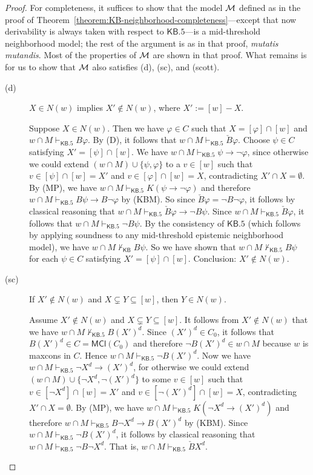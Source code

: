 \documentclass[12pt]{article}
\theoremstyle{definition}
\newcommand{\M}{{\cal M}}      %
\newcommand{\KB}{{\mathsf{KB}}}                 %
\newcommand{\KBeq}{{\mathsf{KB.5}}}             %
\newcommand{\MCl}{\mathsf{MCl}}                   %
\begin{document}
\begin{proof}
  For completeness, it suffices to show that the model $\M$ defined as
  in the proof of
  Theorem~\ref{theorem:KB-neighborhood-completeness}---except that now
  derivability is always taken with respect to $\KBeq$---is a
  mid-threshold neighborhood model; the rest of the argument is as in
  that proof, \emph{mutatis mutandis}.  Most of the properties of $\M$
  are shown in that proof.  What remains is for us to show that $\M$
  also satisfies (d), (sc), and (scott).
  \begin{description}
  \item[(d)] $X\in N(w)$ implies $X'\notin N(w)$, where
    $X':=[w]-X$.

    Suppose $X\in N(w)$.  Then we have $\varphi\in C$ such that
    $X=[\varphi]\cap[w]$ and $w\cap M\vdash_\KBeq B\varphi$.  By (D),
    it follows that $w\cap M\vdash_\KBeq\check B\varphi$.  Choose
    $\psi\in C$ satisfying $X'=[\psi]\cap[w]$.  We have
    $w\cap M\vdash_\KBeq\psi\to\lnot\varphi$, since otherwise we could
    extend $(w\cap M)\cup\{\psi,\varphi\}$ to a $v\in[w]$ such that
    $v\in[\psi]\cap[w]=X'$ and $v\in[\varphi]\cap[w]=X$, contradicting
    $X'\cap X=\emptyset$.  By (MP), we have
    $w\cap M\vdash_\KBeq K(\psi\to\lnot\varphi)$ and therefore
    $w\cap M\vdash_\KBeq B\psi\to B\lnot\varphi$ by (KBM).  So since
    $\check B\varphi=\lnot B\lnot\varphi$, it follows by classical
    reasoning that
    $w\cap M\vdash_\KBeq \check B\varphi\to\lnot B\psi$.  Since
    $w\cap M\vdash_\KBeq\check B\varphi$, it follows that
    $w\cap M\vdash_\KBeq\lnot B\psi$.  By the consistency of $\KBeq$
    (which follows by applying soundness to any mid-threshold
    epistemic neighborhood model), we have $w\cap M\nvdash_\KB B\psi$.
    So we have shown that $w\cap M\nvdash_\KBeq B\psi$ for each
    $\psi\in C$ satisfying $X'=[\psi]\cap[w]$.  Conclusion:
    $X'\notin N(w)$.

  \item[(sc)] If $X'\notin N(w)$ and $X\subsetneq Y\subseteq[w]$,
    then $Y\in N(w)$.

    Assume $X'\notin N(w)$ and $X\subsetneq Y\subseteq[w]$.  It
    follows from $X'\notin N(w)$ that we have
    $w\cap M\nvdash_\KBeq B(X')^d$.  Since $(X')^d\in C_0$, it follows
    that $B(X')^d\in C=\MCl(C_0)$ and therefore
    $\lnot B(X')^d\in w\cap M$ because $w$ is maxcons in $C$.  Hence
    $w\cap M\vdash_\KBeq \lnot B(X')^d$.  Now we have
    $w\cap M\vdash_\KBeq \lnot X^d\to (X')^d$, for otherwise we could
    extend $(w\cap M)\cup\{\lnot X^d,\lnot(X')^d\}$ to some $v\in[w]$
    such that $v\in[\lnot X^d]\cap[w]=X'$ and
    $v\in[\lnot(X')^d]\cap[w]=X$, contradicting $X'\cap X=\emptyset$.
    By (MP), we have $w\cap M\vdash_\KBeq K(\lnot X^d\to (X')^d)$ and
    therefore $w\cap M\vdash_\KBeq B\lnot X^d\to B(X')^d$ by (KBM).
    Since $w\cap M\vdash_\KBeq \lnot B(X')^d$, it follows by classical
    reasoning that $w\cap M\vdash_\KBeq\lnot B\lnot X^d$.  That is,
    $w\cap M\vdash_\KBeq\check B X^d$.


\end{description}
\end{proof}
\end{document}
